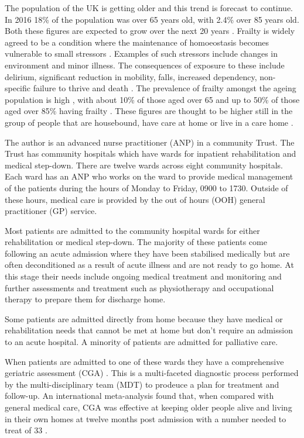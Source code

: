 \documentclass
[
	12pt,
	a4paper,
	oneside,
]{article}
\begin{document}
The population of the UK is getting older and this trend is forecast to continue.
In 2016 18\% of the population was over 65 years old, with 2.4\% over 85 years old.
Both these figures are expected to grow over the next 20 years \parencite{ons:17}.
Frailty is widely agreed to be a condition where the maintenance of homoeostasis 
becomes vulnerable to 
small stressors \parencite{vellas:16}.  Examples of such stressors include changes in environment and minor
illness. The consequences of exposure to these include delirium, significant reduction in mobility,
falls, increased dependency, non-specific failure to thrive and death 
\parencite{bgs:14,oliver:14,vellas:16}.
The prevalence of frailty amongst the ageing population is high \parencite{clegg:13},
with about 10\% of those aged over 65 and up to 50\% of
those aged over 85\% having frailty \parencite{bgs:14}. These figures
are thought to be higher still in the group of people that are housebound, 
have care at home or live in a care home \parencite{oliver:14}.

The author is an advanced nurse practitioner (ANP) in a community Trust.
The Trust has community hospitals which have wards for inpatient rehabilitation and
medical step-down. There are twelve wards across eight community hospitals. Each ward has
an ANP who works on the ward to provide medical management of the patients during 
the hours of Monday to Friday, 0900 to 1730. Outside of these hours, medical care 
is provided by the out of hours (OOH) general practitioner (GP) service. 

Most patients are admitted to the community hospital wards for either rehabilitation
or medical step-down. The majority of these patients come following an acute admission
where they have been stabilised medically but are often deconditioned as a result
of acute illness and are not ready to go home. At this stage their needs include 
ongoing medical treatment and monitoring and further assessments and treatment such 
as physiotherapy and occupational therapy to prepare them for discharge home.

Some patients are admitted directly from home because they have medical or rehabilitation
needs that cannot be met at home but don't require an admission to an acute hospital.
A minority of patients are admitted for palliative care.

When patients are admitted to one of these wards they have a comprehensive geriatric 
assessment (CGA) \parencite{bgs:14}. This is a multi-faceted diagnostic process
performed by the multi-disciplinary team (MDT) to prodeuce a plan for treatment 
and follow-up.
An international meta-analysis found that, when compared with general medical care,
CGA was effective at keeping older people alive and living in their own homes at
twelve months post admission with a number needed to treat of 33 \parencite{ellis:11}.
\end{document}
